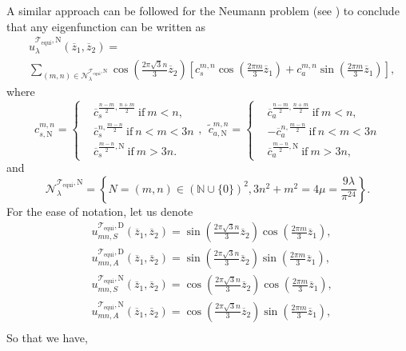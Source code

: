 \documentclass{amsart}
\theoremstyle{definition}
\theoremstyle{remark}
\numberwithin{equation}{section}
\theoremstyle{definition}
\theoremstyle{remark}
\begin{document}
A similar approach can be followed for the Neumann problem (see \cite{trigII}) to conclude that any eigenfunction can be written as \begin{equation}
	\begin{aligned}
	    &u_\lambda^{\mathcal{T}_\mathrm{equi},\mathrm{N}}\left(\overline{z}_1,\overline{z}_2\right)=\\&\sum_{(m,n)\in \mathcal{N}_\lambda^{\mathcal{T}_\mathrm{equi},\mathrm{N}}}\cos\left(\frac{2\pi\sqrt{3}n}{3}\overline{z}_2\right)\left[c_s^{m,n}\cos\left(\frac{2\pi m}{3}\overline{z}_1\right)+c_a^{m,n}\sin\left(\frac{2\pi m}{3}\overline{z}_1\right)\right],
	\end{aligned}
\end{equation}where
\begin{equation}
	c_{s,\mathrm{N}}^{m,n}=\left\{	\begin{aligned}
		&\overline{c}_s^{\frac{n-m}{2},\frac{n+m}{2}}\ \text{if}\ m<n,\\&\overline{c}_s^{n,\frac{m-n}{2}}\ \text{if}\ n<m<3n\\&\overline{c}_s^{\frac{m-n}{2},\mathrm{N}}\ \text{if}\ m>3n.
	\end{aligned}\right.,\ \
	\tilde{c}_{a,\mathrm{N}}^{m,n}=\left\{	\begin{aligned}
		&\overline{c}_a^{\frac{n-m}{2},\frac{n+m}{2}}\ \text{if}\ m<n,\\&-\overline{c}_a^{n,\frac{m-n}{2}}\ \text{if}\ n<m<3n\\&\overline{c}_a^{\frac{m-n}{2},\mathrm{N}}\ \text{if}\ m>3n,
	\end{aligned}\right.
\end{equation}
and 
\begin{equation}
	\mathcal{N}_\lambda^{\mathcal{T}_\mathrm{equi},\mathrm{N}}=\left\{N=(m,n)\in\left(\mathbb{N}\cup\{0\}\right)^2, 3n^2+m^2=4\mu=\frac{9\lambda}{\pi^24}\right\}.
\end{equation}
For the ease of notation, let us denote \begin{equation}
	\begin{aligned}
		&u^{\mathcal{T}_\mathrm{equi},\mathrm{D}}_{mn,S}(\overline{z}_1,\overline{z}_2)=\sin\left(\frac{2\pi\sqrt{3}n}{3}\overline{z}_2\right)\cos\left(\frac{2\pi m}{3}\overline{z}_1\right),\\
		&u^{\mathcal{T}_\mathrm{equi},\mathrm{D}}_{mn,A}(\overline{z}_1,\overline{z}_2)=\sin\left(\frac{2\pi\sqrt{3}n}{3}\overline{z}_2\right)\sin\left(\frac{2\pi m}{3}\overline{z}_1\right),\\
		&u^{\mathcal{T}_\mathrm{equi},\mathrm{N}}_{mn,S}(\overline{z}_1,\overline{z}_2)=\cos\left(\frac{2\pi\sqrt{3}n}{3}\overline{z}_2\right)\cos\left(\frac{2\pi m}{3}\overline{z}_1\right),\\
		&u^{\mathcal{T}_\mathrm{equi},\mathrm{N}}_{mn,A}(\overline{z}_1,\overline{z}_2)=\cos\left(\frac{2\pi\sqrt{3}n}{3}\overline{z}_2\right)\sin\left(\frac{2\pi m}{3}\overline{z}_1\right),\\
	\end{aligned}
\end{equation}So that we have, 
\end{document}
